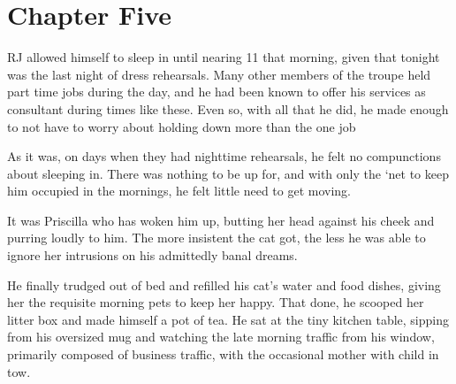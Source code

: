 \chapter*{Chapter Five}

RJ allowed himself to sleep in until nearing 11 that morning, given that tonight was the last night of dress rehearsals.  Many other members of the troupe held part time jobs during the day, and he had been known to offer his services as consultant during times like these.  Even so, with all that he did, he made enough to not have to worry about holding down more than the one job

As it was, on days when they had nighttime rehearsals, he felt no compunctions about sleeping in.  There was nothing to be up for, and with only the `net to keep him occupied in the mornings, he felt little need to get moving.

It was Priscilla who has woken him up, butting her head against his cheek and purring loudly to him.  The more insistent the cat got, the less he was able to ignore her intrusions on his admittedly banal dreams.

He finally trudged out of bed and refilled his cat's water and food dishes, giving her the requisite morning pets to keep her happy.  That done, he scooped her litter box and made himself a pot of tea.  He sat at the tiny kitchen table, sipping from his oversized mug and watching the late morning traffic from his window, primarily composed of business traffic, with the occasional mother with child in tow.




